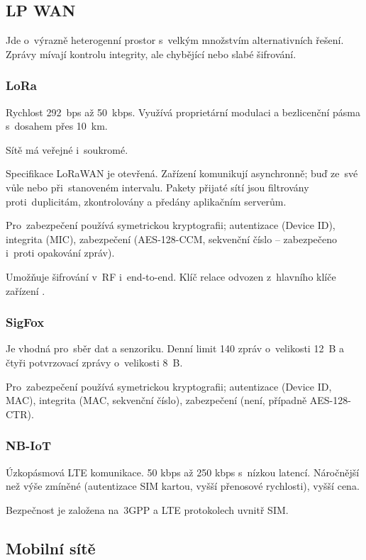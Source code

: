 \subsection{LP WAN}

Jde o~výrazně heterogenní prostor s~velkým množstvím alternativních řešení.
Zprávy mívají kontrolu integrity, ale chybějící nebo slabé šifrování.


\subsubsection{LoRa}

Rychlost 292~bps až 50~kbps.
Využívá proprietární modulaci a bezlicenční pásma s~dosahem přes 10~km.

Sítě má veřejné i~soukromé.

Specifikace LoRaWAN je otevřená.
Zařízení komunikují asynchronně; buď ze~své vůle nebo při~stanoveném intervalu.
Pakety přijaté sítí jsou filtrovány proti~duplicitám, zkontrolovány a předány aplikačním serverům.

Pro~zabezpečení používá symetrickou kryptografii; autentizace (Device ID), integrita (MIC), zabezpečení (AES-128-CCM, sekvenční číslo -- zabezpečeno i~proti opakování zpráv).

Umožňuje šifrování v~RF i~end-to-end. Klíč relace  odvozen z~hlavního klíče zařízení .


\subsubsection{SigFox}


Je vhodná pro~sběr dat a senzoriku.
Denní limit 140 zpráv o~velikosti 12~B a čtyři potvrzovací zprávy o~velikosti 8~B.

Pro~zabezpečení používá symetrickou kryptografii; autentizace (Device ID, MAC), integrita (MAC, sekvenční číslo), zabezpečení (není, případně AES-128-CTR).


\subsubsection{NB-IoT}

Úzkopásmová LTE komunikace.
50 kbps až 250 kbps s~nízkou latencí.
Náročnější než výše zmíněné (autentizace SIM kartou, vyšší přenosové rychlosti), vyšší cena.

Bezpečnost je založena na~3GPP a LTE protokolech uvnitř SIM.


\subsection{Mobilní sítě}

